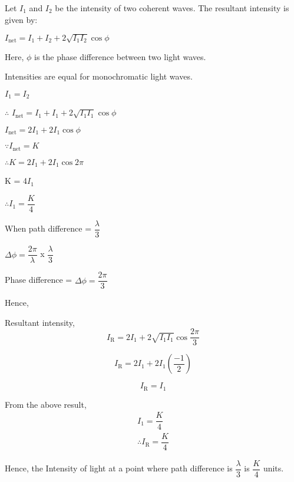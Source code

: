 \documentclass[journal,12pt,twocolumn]{IEEEtran}
\theoremstyle{remark}
\begin{document}
Let $I_1$ and $I_2$ be the intensity of two coherent waves. The resultant intensity is given by:

$I_{\text{net}} = I_1 + I_2 + 2\sqrt{I_1I_2}\cos{\phi}$

Here, $\phi$ is the phase difference between two light waves.

Intensities are equal for monochromatic light waves.

\hspace{1cm}$I_1 = I_2$

$\therefore$ $I_{\text{net}} = I_1 + I_1 + 2\sqrt{I_1I_1}\cos{\phi}$

\vspace{0.2cm}

       \hspace{0.2cm}      $I_{\text{net}} = 2I_1 + 2I_1\cos{\phi}$

$\because I_{\text{net}} = K$


$\therefore K = 2I_1 +2I_1\cos{2\pi}$

\vspace{0.2cm}

        \hspace*{0.4cm}    K = 4$I_1$

\vspace{0.2cm}

      \hspace{1cm}  $\therefore    I_1=\dfrac{K}{4}$

\vspace{1cm}

When path difference = $\dfrac{\lambda}{3}$

\vspace{0.2cm}

\hspace{1cm}$\Delta \phi = \dfrac{2\pi}{\lambda}$  x $ \dfrac{\lambda}{3}$

\vspace{0.2cm}

Phase difference = $ \Delta \phi = \dfrac{2\pi}{3} $

Hence,

\hspace*{0.5cm}Resultant intensity,
\[I_{\text{R}} = 2I_1 + 2\sqrt{I_1I_1}\cos{\dfrac{2\pi}{3}}\]

\[I_{\text{R}}= 2I_1 + 2I_1\left(\dfrac{-1}{2}\right)\]

\[I_{\text{R}} = I_1\]

From the above result,
\hspace*{0.5cm}
\begin{align*}
I_1 = \dfrac{K}{4}\\
\therefore I_{\text{R}} = \dfrac{K}{4}
\end{align*}

Hence, the Intensity of light at a point where path difference is $\dfrac{\lambda}{3}$ is $\dfrac{K}{4}$ units.


\end{document}
